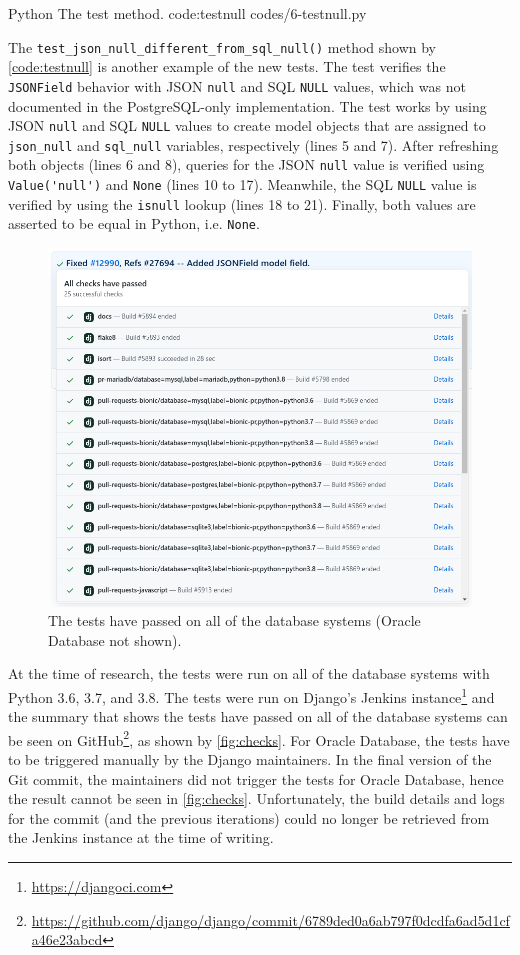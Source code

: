 \listing
{Python}
{The  test method.}
{code:testnull}
{codes/6-testnull.py}

The \verb|test_json_null_different_from_sql_null()| method shown by
\autoref{code:testnull} is another example of the new tests. The test verifies
the \verb|JSONField| behavior with JSON \verb|null| and SQL \verb|NULL| values,
which was not documented in the PostgreSQL-only implementation. The test works
by using JSON \verb|null| and SQL \verb|NULL| values to create model objects
that are assigned to \verb|json_null| and \verb|sql_null| variables,
respectively (lines 5 and 7). After refreshing both objects (lines 6 and 8),
queries for the JSON \verb|null| value is verified using \verb|Value('null')|
and \verb|None| (lines 10 to 17). Meanwhile, the SQL \verb|NULL| value is
verified by using the \verb|isnull| lookup (lines 18 to 21). Finally, both
values are asserted to be equal in Python, i.e. \verb|None|.

\begin{figure}
	\centering
    \includegraphics[width=1.00\textwidth]{pics/github-checks.png}
	\caption{The tests have passed on all of the database systems
	(Oracle Database not shown).}
	\label{fig:checks}
\end{figure}

At the time of research, the tests were run on all of the database systems with
Python 3.6, 3.7, and 3.8. The tests were run on Django's Jenkins
instance\footnote{\url{https://djangoci.com}} and the summary that shows the
tests have passed on all of the database systems can be seen on
GitHub\footnote{\url{https://github.com/django/django/commit/6789ded0a6ab797f0dcdfa6ad5d1cfa46e23abcd}},
as shown by \autoref{fig:checks}. For Oracle Database, the tests have to be
triggered manually by the Django maintainers. In the final version of the Git
commit, the maintainers did not trigger the tests for Oracle Database, hence
the result cannot be seen in \autoref{fig:checks}. Unfortunately, the build
details and logs for the commit (and the previous iterations) could no longer
be retrieved from the Jenkins instance at the time of writing.

